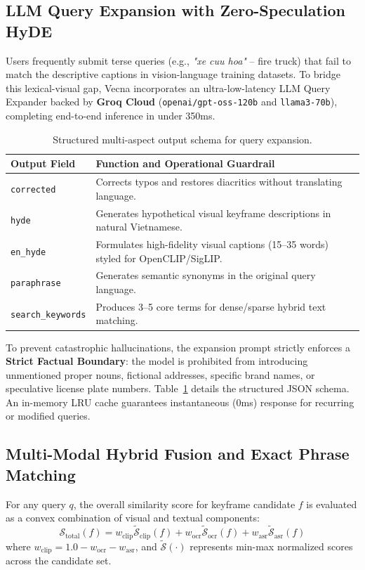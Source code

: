 \documentclass[10pt,a4paper,twocolumn]{article}
\begin{document}
\subsection{LLM Query Expansion with Zero-Speculation HyDE}
Users frequently submit terse queries (e.g., \textit{"xe cuu hoa"} -- fire truck) that fail to match the descriptive captions in vision-language training datasets. To bridge this lexical-visual gap, Vecna incorporates an ultra-low-latency LLM Query Expander backed by \textbf{Groq Cloud} (\texttt{openai/gpt-oss-120b} and \texttt{llama3-70b}), completing end-to-end inference in under 350ms.

\begin{table}[b]
\vspace{-0.3cm}
\caption{Structured multi-aspect output schema for query expansion.}
\label{tab:llm_schema}
\centering
\scriptsize
\begin{tabularx}{\columnwidth}{lX}
\toprule
\textbf{Output Field} & \textbf{Function and Operational Guardrail} \\
\midrule
\texttt{corrected} & Corrects typos and restores diacritics without translating language. \\
\texttt{hyde} & Generates hypothetical visual keyframe descriptions in natural Vietnamese. \\
\texttt{en\_hyde} & Formulates high-fidelity visual captions (15--35 words) styled for OpenCLIP/SigLIP. \\
\texttt{paraphrase} & Generates semantic synonyms in the original query language. \\
\texttt{search\_keywords} & Produces 3--5 core terms for dense/sparse hybrid text matching. \\
\bottomrule
\end{tabularx}
\end{table}

To prevent catastrophic hallucinations, the expansion prompt strictly enforces a \textbf{Strict Factual Boundary}: the model is prohibited from introducing unmentioned proper nouns, fictional addresses, specific brand names, or speculative license plate numbers. Table~\ref{tab:llm_schema} details the structured JSON schema. An in-memory LRU cache guarantees instantaneous (0ms) response for recurring or modified queries.

\subsection{Multi-Modal Hybrid Fusion and Exact Phrase Matching}
For any query $q$, the overall similarity score for keyframe candidate $f$ is evaluated as a convex combination of visual and textual components:
\begin{equation}
\mathcal{S}_{\text{total}}(f) = w_{\text{clip}} \tilde{\mathcal{S}}_{\text{clip}}(f) + w_{\text{ocr}} \tilde{\mathcal{S}}_{\text{ocr}}(f) + w_{\text{asr}} \tilde{\mathcal{S}}_{\text{asr}}(f)
\end{equation}
where $w_{\text{clip}} = 1.0 - w_{\text{ocr}} - w_{\text{asr}}$, and $\tilde{\mathcal{S}}(\cdot)$ represents min-max normalized scores across the candidate set.
\end{document}
